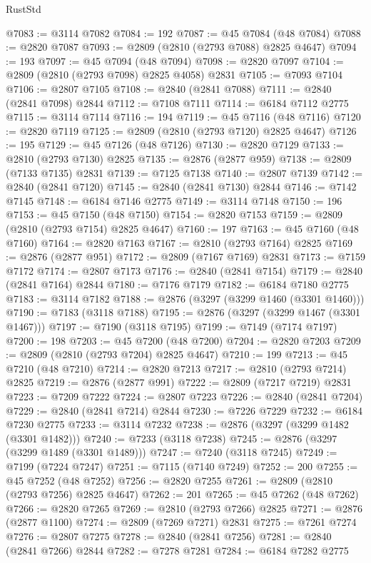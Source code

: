 \begin{lexlean}{RustStd}
\begin{coremodule}
@7083 := @3114 @7082
@7084 := 192
@7087 := @45 @7084 (@48 @7084)
@7088 := @2820 @7087
@7093 := @2809 (@2810 (@2793 @7088) @2825 @4647)
@7094 := 193
@7097 := @45 @7094 (@48 @7094)
@7098 := @2820 @7097
@7104 := @2809 (@2810 (@2793 @7098) @2825 @4058) @2831
@7105 := @7093 @7104
@7106 := @2807 @7105
@7108 := @2840 (@2841 @7088)
@7111 := @2840 (@2841 @7098) @2844
@7112 := @7108 @7111
@7114 := @6184 @7112 @2775
@7115 := @3114 @7114
@7116 := 194
@7119 := @45 @7116 (@48 @7116)
@7120 := @2820 @7119
@7125 := @2809 (@2810 (@2793 @7120) @2825 @4647)
@7126 := 195
@7129 := @45 @7126 (@48 @7126)
@7130 := @2820 @7129
@7133 := @2810 (@2793 @7130) @2825
@7135 := @2876 (@2877 @959)
@7138 := @2809 (@7133 @7135) @2831
@7139 := @7125 @7138
@7140 := @2807 @7139
@7142 := @2840 (@2841 @7120)
@7145 := @2840 (@2841 @7130) @2844
@7146 := @7142 @7145
@7148 := @6184 @7146 @2775
@7149 := @3114 @7148
@7150 := 196
@7153 := @45 @7150 (@48 @7150)
@7154 := @2820 @7153
@7159 := @2809 (@2810 (@2793 @7154) @2825 @4647)
@7160 := 197
@7163 := @45 @7160 (@48 @7160)
@7164 := @2820 @7163
@7167 := @2810 (@2793 @7164) @2825
@7169 := @2876 (@2877 @951)
@7172 := @2809 (@7167 @7169) @2831
@7173 := @7159 @7172
@7174 := @2807 @7173
@7176 := @2840 (@2841 @7154)
@7179 := @2840 (@2841 @7164) @2844
@7180 := @7176 @7179
@7182 := @6184 @7180 @2775
@7183 := @3114 @7182
@7188 := @2876 (@3297 (@3299 @1460 (@3301 @1460)))
@7190 := @7183 (@3118 @7188)
@7195 := @2876 (@3297 (@3299 @1467 (@3301 @1467)))
@7197 := @7190 (@3118 @7195)
@7199 := @7149 (@7174 @7197)
@7200 := 198
@7203 := @45 @7200 (@48 @7200)
@7204 := @2820 @7203
@7209 := @2809 (@2810 (@2793 @7204) @2825 @4647)
@7210 := 199
@7213 := @45 @7210 (@48 @7210)
@7214 := @2820 @7213
@7217 := @2810 (@2793 @7214) @2825
@7219 := @2876 (@2877 @991)
@7222 := @2809 (@7217 @7219) @2831
@7223 := @7209 @7222
@7224 := @2807 @7223
@7226 := @2840 (@2841 @7204)
@7229 := @2840 (@2841 @7214) @2844
@7230 := @7226 @7229
@7232 := @6184 @7230 @2775
@7233 := @3114 @7232
@7238 := @2876 (@3297 (@3299 @1482 (@3301 @1482)))
@7240 := @7233 (@3118 @7238)
@7245 := @2876 (@3297 (@3299 @1489 (@3301 @1489)))
@7247 := @7240 (@3118 @7245)
@7249 := @7199 (@7224 @7247)
@7251 := @7115 (@7140 @7249)
@7252 := 200
@7255 := @45 @7252 (@48 @7252)
@7256 := @2820 @7255
@7261 := @2809 (@2810 (@2793 @7256) @2825 @4647)
@7262 := 201
@7265 := @45 @7262 (@48 @7262)
@7266 := @2820 @7265
@7269 := @2810 (@2793 @7266) @2825
@7271 := @2876 (@2877 @1100)
@7274 := @2809 (@7269 @7271) @2831
@7275 := @7261 @7274
@7276 := @2807 @7275
@7278 := @2840 (@2841 @7256)
@7281 := @2840 (@2841 @7266) @2844
@7282 := @7278 @7281
@7284 := @6184 @7282 @2775

\end{coremodule}
\end{lexlean}
